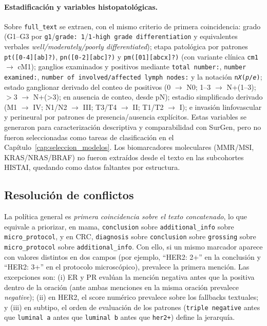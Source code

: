 \paragraph{Estadificación y variables histopatológicas.} Sobre \texttt{full\_text} se extraen, con el mismo criterio de primera coincidencia: grado (G1--G3 por \texttt{g1}/\texttt{grade: 1}/\texttt{1-high grade differentiation} y equivalentes verbales \emph{well/moderately/poorly differentiated}); etapa patológica por patrones \texttt{pt([0-4][ab]?)}, \texttt{pn([0-2][abc]?)} y \texttt{pm([01][abcx]?)} (con variante clínica \texttt{cm1} $\rightarrow$ cM1); ganglios examinados y positivos mediante \texttt{total number:}, \texttt{number examined:}, \texttt{number of involved/affected lymph nodes:} y la notación \texttt{n\textit{X}(\textit{p}/\textit{e})}; estado ganglionar derivado del conteo de positivos (0 $\rightarrow$ N0; 1--3 $\rightarrow$ N+(1--3); $>$3 $\rightarrow$ N+(>3); en ausencia de conteo, desde pN); estadio simplificado derivado (M1 $\rightarrow$ IV; N1/N2 $\rightarrow$ III; T3/T4 $\rightarrow$ II; T1/T2 $\rightarrow$ I); e invasión linfovascular y perineural por patrones de presencia/ausencia explícitos. Estas variables se generaron para caracterización descriptiva y comparabilidad con SurGen, pero no fueron seleccionadas como tareas de clasificación en el Capítulo~\ref{cap:seleccion_modelos}. Los biomarcadores moleculares (MMR/MSI, KRAS/NRAS/BRAF) no fueron extraídos desde el texto en las subcohortes HISTAI, quedando como datos faltantes por estructura.

\subsection{Resolución de conflictos}

La política general es \emph{primera coincidencia sobre el texto concatenado}, lo que equivale a priorizar, en mama, \texttt{conclusion} sobre \texttt{additional\_info} sobre \texttt{micro\_protocol}, y en CRC, \texttt{diagnosis} sobre \texttt{conclusion} sobre \texttt{grossing} sobre \texttt{micro\_protocol} sobre \texttt{additional\_info}. Con ello, si un mismo marcador aparece con valores distintos en dos campos (por ejemplo, ``HER2: 2+'' en la conclusión y ``HER2: 3+'' en el protocolo microscópico), prevalece la primera mención. Las excepciones son: (i) ER y PR evalúan la mención negativa antes que la positiva dentro de la oración (ante ambas menciones en la misma oración prevalece \emph{negative}); (ii) en HER2, el score numérico prevalece sobre los fallbacks textuales; y (iii) en subtipo, el orden de evaluación de los patrones (\texttt{triple negative} antes que \texttt{luminal a} antes que \texttt{luminal b} antes que \texttt{her2+}) define la jerarquía.

